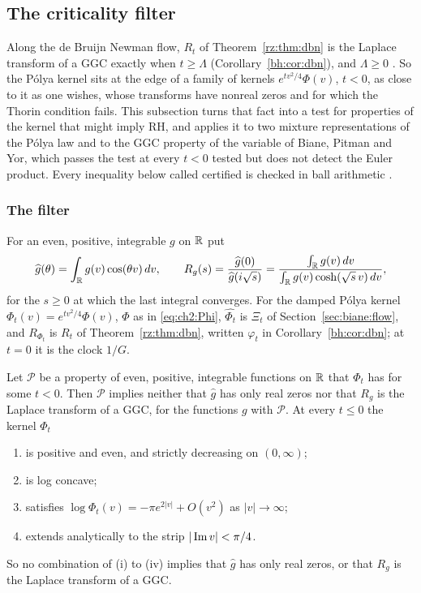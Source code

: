 \subsection{The criticality filter}\label{pk:sec:filter}

Along the de Bruijn Newman flow, $R_t$ of Theorem~\ref{rz:thm:dbn} is the Laplace transform of a GGC exactly when $t\ge\Lambda$ (Corollary~\ref{bh:cor:dbn}), and $\Lambda\ge0$ \cite{RodgersTao}. So the P\'olya kernel sits at the edge of a family of kernels $e^{tv^2/4}\Phi(v)$, $t<0$, as close to it as one wishes, whose transforms have nonreal zeros and for which the Thorin condition fails. This subsection turns that fact into a test for properties of the kernel that might imply RH, and applies it to two mixture representations of the P\'olya law and to the GGC property of the variable of Biane, Pitman and Yor, which passes the test at every $t<0$ tested but does not detect the Euler product. Every inequality below called certified is checked in ball arithmetic \cite{Arb}.

\subsubsection{The filter}\label{pk:sec:filtertest}

For an even, positive, integrable $g$ on $\mathbb{R}$ put
\begin{equation}\label{pk:eq:Rg}
\widehat g(\theta)=\int_{\mathbb{R}}g(v)\cos(\theta v)\,dv,\qquad R_g(s)=\frac{\widehat g(0)}{\widehat g(i\sqrt s)}=\frac{\int_{\mathbb{R}}g(v)\,dv}{\int_{\mathbb{R}}g(v)\cosh(\sqrt s\,v)\,dv},
\end{equation}
for the $s\ge0$ at which the last integral converges. For the damped P\'olya kernel $\Phi_t(v)=e^{tv^2/4}\Phi(v)$, $\Phi$ as in \eqref{eq:ch2:Phi}, $\widehat{\Phi_t}$ is $\Xi_t$ of Section~\ref{sec:biane:flow}, and $R_{\Phi_t}$ is $R_t$ of Theorem~\ref{rz:thm:dbn}, written $\varphi_t$ in Corollary~\ref{bh:cor:dbn}; at $t=0$ it is the clock $1/G$.

\begin{proposition}\label{pk:prop:filter}
Let $\mathcal P$ be a property of even, positive, integrable functions on $\mathbb{R}$ that $\Phi_t$ has for some $t<0$. Then $\mathcal P$ implies neither that $\widehat g$ has only real zeros nor that $R_g$ is the Laplace transform of a GGC, for the functions $g$ with $\mathcal P$. At every $t\le0$ the kernel $\Phi_t$
\begin{enumerate}
\item[(i)] is positive and even, and strictly decreasing on $(0,\infty)$;
\item[(ii)] is log concave;
\item[(iii)] satisfies $\log\Phi_t(v)=-\pi e^{2|v|}+O(v^2)$ as $|v|\to\infty$;
\item[(iv)] extends analytically to the strip $|\operatorname{Im} v|<\pi/4$.
\end{enumerate}
So no combination of (i) to (iv) implies that $\widehat g$ has only real zeros, or that $R_g$ is the Laplace transform of a GGC.
\end{proposition}

